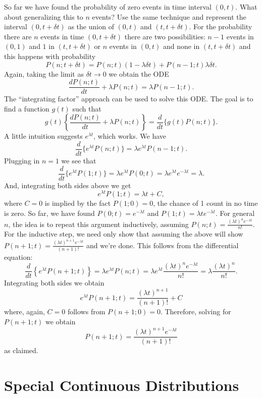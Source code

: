 \documentclass[
]{book}
\begin{document}
So far we have found the probability of zero events in time interval \((0,t)\). What about generalizing this to \(n\) events? Use the same technique and represent the interval \((0, t+\delta t)\) as the union of \((0,t)\) and \((t, t+\delta t)\). For the probability there are \(n\) events in time \((0,t+\delta t)\) there are two possibilities: \(n-1\) events in \((0,1)\) and \(1\) in \((t, t+\delta t)\) or \(n\) events in \((0,t)\) and none in \((t, t+\delta t)\) and this happens with probability
\[P(n;t+\delta t)  = P(n;t)(1-\lambda \delta t) + P(n-1;t)\lambda\delta t.\]
Again, taking the limit as \(\delta t \rightarrow 0\) we obtain the ODE
\[\frac{d P(n;t)}{dt} + \lambda P(n;t) = \lambda P(n-1;t).\]
The ``integrating factor'' approach can be used to solve this ODE. The goal is to find a function \(g(t)\) such that
\[g(t)\left\{\frac{d P(n;t)}{dt} + \lambda P(n;t)\right\} = \frac{d}{dt}\{g(t)P(n;t)\}.\]
A little intuition suggests \(e^{\lambda t}\), which works. We have
\[\frac{d}{dt}\{e^{\lambda t}P(n;t)\} = \lambda e^{\lambda t}P(n-1;t).\]
Plugging in \(n=1\) we see that
\[\frac{d}{dt}\{e^{\lambda t}P(1;t)\} = \lambda e^{\lambda t}P(0;t) = \lambda e^{\lambda t}e^{-\lambda t} = \lambda.\]
And, integrating both sides above we get
\[e^{\lambda t}P(1;t) = \lambda t + C,\]
where \(C = 0\) is implied by the fact \(P(1;0) = 0\), the chance of 1 count in no time is zero.
So far, we have found \(P(0;t) = e^{-\lambda t}\) and \(P(1;t) = \lambda t e^{-\lambda t}\). For general \(n\), the idea is to repeat this argument inductively, assuming \(P(n;t) = \frac{(\lambda t)^n e^{-\lambda t}}{n!}\). For the inductive step, we need only show that assuming the above will show \(P(n+1;t) = \frac{(\lambda t)^{n+1} e^{-\lambda t}}{(n+1)!}\) and we're done. This follows from the differential equation:
\[\frac{d}{dt}\left\{e^{\lambda t}P(n+1;t)\right\} = \lambda e^{\lambda t}P(n;t) = \lambda e^{\lambda t} \frac{(\lambda t)^n e^{-\lambda t}}{n!} = \lambda \frac{(\lambda t)^n}{n!}.\]
Integrating both sides we obtain
\[e^{\lambda t}P(n+1;t) = \frac{(\lambda t)^{n+1}}{(n+1)!}+C\]
where, again, \(C=0\) follows from \(P(n+1;0) = 0\). Therefore, solving for \(P(n+1;t)\) we obtain
\[P(n+1;t) = \frac{(\lambda t)^{n+1}e^{-\lambda t}}{(n+1)!}\]
as claimed.

\hypertarget{special-continuous-distributions}{%
\chapter{Special Continuous Distributions}\label{special-continuous-distributions}}
\end{document}
